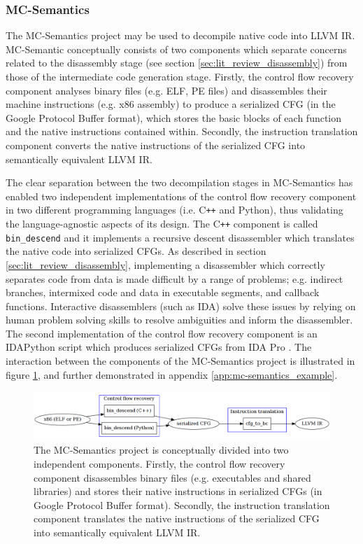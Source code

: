 
\subsubsection{MC-Semantics}
\label{sec:rel_work_mc-semantics}

The MC-Semantics project may be used to decompile native code into LLVM IR. MC-Semantic conceptually consists of two components which separate concerns related to the disassembly stage (see section \ref{sec:lit_review_disassembly}) from those of the intermediate code generation stage. Firstly, the control flow recovery component analyses binary files (e.g. ELF, PE files) and disassembles their machine instructions (e.g. x86 assembly) to produce a serialized CFG (in the Google Protocol Buffer format), which stores the basic blocks of each function and the native instructions contained within. Secondly, the instruction translation component converts the native instructions of the serialized CFG into semantically equivalent LLVM IR.

The clear separation between the two decompilation stages in MC-Semantics has enabled two independent implementations of the control flow recovery component in two different programming languages (i.e. C\texttt{++} and Python), thus validating the language-agnostic aspects of its design. The C\texttt{++} component is called \texttt{bin\_descend} and it implements a recursive descent disassembler which translates the native code into serialized CFGs. As described in section \ref{sec:lit_review_disassembly}, implementing a disassembler which correctly separates code from data is made difficult by a range of problems; e.g. indirect branches, intermixed code and data in executable segments, and callback functions. Interactive disassemblers (such as IDA) solve these issues by relying on human problem solving skills to resolve ambiguities and inform the disassembler. The second implementation of the control flow recovery component is an IDAPython script which produces serialized CFGs from IDA Pro \cite{mcsema}. The interaction between the components of the MC-Semantics project is illustrated in figure \ref{fig:mcsema_overview}, and further demonstrated in appendix \ref{app:mc-semantics_example}.

\begin{figure}[htbp]
	\includegraphics[width=\textwidth]{inc/3_rel_work/mcsema_overview.png}
	\caption{The MC-Semantics project is conceptually divided into two independent components. Firstly, the control flow recovery component disassembles binary files (e.g. executables and shared libraries) and stores their native instructions in serialized CFGs (in Google Protocol Buffer format). Secondly, the instruction translation component translates the native instructions of the serialized CFG into semantically equivalent LLVM IR.}
	\label{fig:mcsema_overview}
\end{figure}

